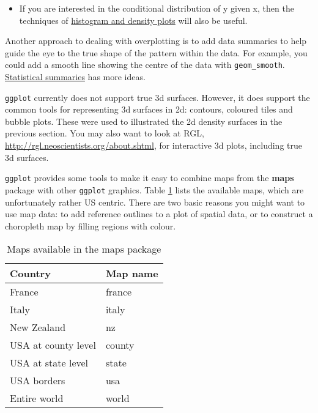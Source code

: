 \begin{itemize}
\itemsep1pt\parskip0pt
\item
  If you are interested in the conditional distribution of y given x,
  then the techniques of \hyperref[sub:distribution]{histogram and
  density plots} will also be useful.
\end{itemize}

Another approach to dealing with overplotting is to add data summaries
to help guide the eye to the true shape of the pattern within the data.
For example, you could add a smooth line showing the centre of the data
with \texttt{geom\_smooth}. \hyperref[sec:summary]{Statistical
summaries} has more ideas.


\texttt{ggplot} currently does not support true 3d surfaces. However, it
does support the common tools for representing 3d surfaces in 2d:
contours, coloured tiles and bubble plots. These were used to
illustrated the 2d density surfaces in the previous section. You may
also want to look at RGL,
\url{http://rgl.neoscientists.org/about.shtml}, for interactive 3d
plots, including true 3d surfaces. 


\texttt{ggplot} provides some tools to make it easy to combine maps from
the \textbf{maps} package with other \texttt{ggplot} graphics. Table
\ref{tbl:maps} lists the available maps, which are unfortunately rather
US centric. There are two basic reasons you might want to use map data:
to add reference outlines to a plot of spatial data, or to construct a
choropleth map by filling regions with colour. 

\begin{table}
  \begin{center}
  \begin{tabular}{ll}
    \toprule
    Country & Map name \\
    \midrule
    France & france \\
    Italy & italy \\
    New Zealand & nz \\
    USA at county level & county \\
    USA at state level & state \\
    USA borders & usa \\
    Entire world & world \\ 
    \bottomrule
  \end{tabular}
  \end{center}
  \caption{Maps available in the maps package}
  \label{tbl:maps}
\end{table}

